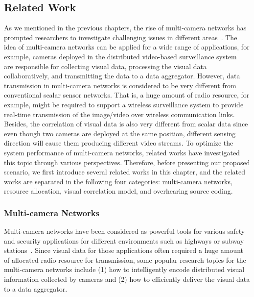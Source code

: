 \subsection{Related Work}
\label{sec::relatedWork}
As we mentioned in the previous chapters, the rise of multi-camera networks has prompted researchers to investigate challenging issues in different areas~\cite{VsnChallenges}.
The idea of multi-camera networks can be applied for a wide range of applications, for example, cameras deployed in the distributed video-based surveillance system~\cite{VideoBasedSurveillanceSystem} are responsible for collecting visual data, processing the visual data collaboratively, and transmitting the data to a data aggregator.
However, data transmission in multi-camera networks is considered to be very different from conventional scalar sensor networks.
That is, a huge amount of radio resource, for example, might be required to support a wireless surveillance system to provide real-time transmission of the image/video over wireless communication links.
Besides, the correlation of visual data is also very different from scalar data since even though two cameras are deployed at the same position, different sensing direction will cause them producing different video streams.
To optimize the system performance of multi-camera networks, related works have investigated this topic through various perspectives.
Therefore, before presenting our proposed scenario, we first introduce several related works in this chapter, and the related works are separated in the following four categories: multi-camera networks, resource allocation, visual correlation model, and overhearing source coding.
%
\subsubsection{Multi-camera Networks}
Multi-camera networks have been considered as powerful tools for various safety and security applications for different environments such as highways or subway stations~\cite{MultiCameraNetworksBook}.
Since visual data for those applications often required a huge amount of allocated radio resource for transmission, some popular research topics for the multi-camera networks include (1) how to intelligently encode distributed visual information collected by cameras and (2) how to efficiently deliver the visual data to a data aggregator.

